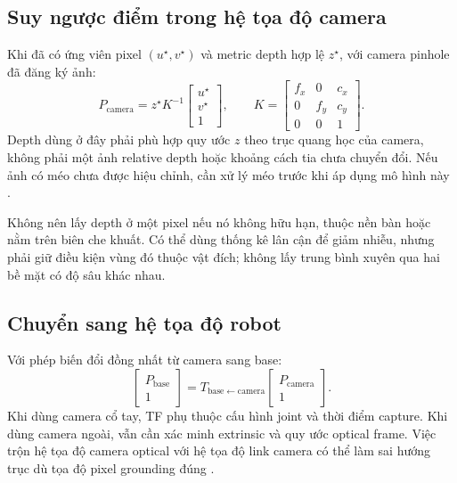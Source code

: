 \subsection{Suy ngược điểm trong hệ tọa độ camera}

Khi đã có ứng viên pixel $(u^\star,v^\star)$ và metric depth hợp lệ
$z^\star$, với camera pinhole đã đăng ký ảnh:
\begin{equation}
    P_{\mathrm{camera}}=
    z^\star K^{-1}
    \begin{bmatrix}u^\star\\v^\star\\1\end{bmatrix},
    \qquad
    K=
    \begin{bmatrix}
        f_x&0&c_x\\
        0&f_y&c_y\\
        0&0&1
    \end{bmatrix}.
    \label{eq:method-backprojection}
\end{equation}
Depth dùng ở đây phải phù hợp quy ước $z$ theo trục quang học của
camera, không phải một ảnh relative depth hoặc khoảng cách tia
chưa chuyển đổi. Nếu ảnh có méo chưa được hiệu chỉnh, cần xử lý
méo trước khi áp dụng mô hình này \cite{opencvCameraModel}.

Không nên lấy depth ở một pixel nếu nó không hữu hạn, thuộc nền
bàn hoặc nằm trên biên che khuất. Có thể dùng thống kê lân cận
để giảm nhiễu, nhưng phải giữ điều kiện vùng đó thuộc vật đích;
không lấy trung bình xuyên qua hai bề mặt có độ sâu khác nhau.

\subsection{Chuyển sang hệ tọa độ robot}

Với phép biến đổi đồng nhất từ camera sang base:
\begin{equation}
    \begin{bmatrix}P_{\mathrm{base}}\\1\end{bmatrix}
    =
    T_{\mathrm{base}\leftarrow\mathrm{camera}}
    \begin{bmatrix}P_{\mathrm{camera}}\\1\end{bmatrix}.
\end{equation}
Khi dùng camera cổ tay, TF phụ thuộc cấu hình joint và thời điểm
capture. Khi dùng camera ngoài, vẫn cần xác minh extrinsic và
quy ước optical frame. Việc trộn hệ tọa độ camera optical với
hệ tọa độ link camera có thể làm sai hướng trục dù tọa độ pixel
grounding đúng \cite{foote2010rep103}.


